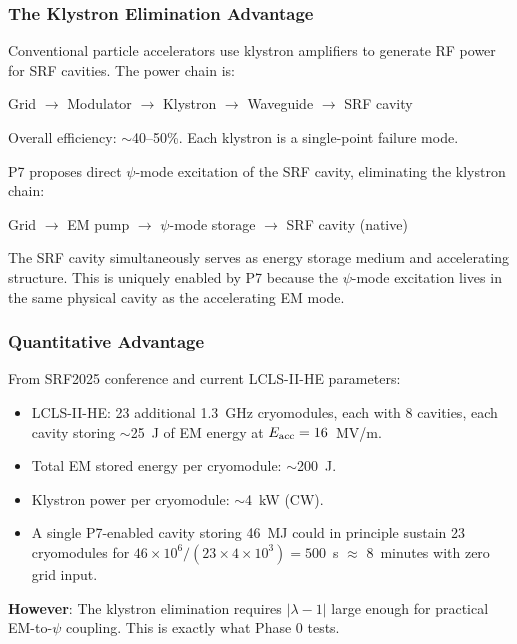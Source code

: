 \documentclass[11pt]{article}
\newcommand{\ee}[1]{\times 10^{#1}}
\newcommand{\lambdaone}{|\lambda-1|}
\begin{document}
\subsubsection{The Klystron Elimination Advantage}

Conventional particle accelerators use klystron amplifiers to generate
RF power for SRF cavities. The power chain is:

\begin{center}
Grid $\to$ Modulator $\to$ Klystron $\to$ Waveguide $\to$ SRF cavity
\end{center}

Overall efficiency: $\sim$40--50\%. Each klystron is a single-point
failure mode.

P7 proposes direct $\psi$-mode excitation of the SRF cavity,
eliminating the klystron chain:

\begin{center}
Grid $\to$ EM pump $\to$ $\psi$-mode storage $\to$ SRF cavity (native)
\end{center}

The SRF cavity simultaneously serves as energy storage medium and
accelerating structure. This is uniquely enabled by P7 because the
$\psi$-mode excitation lives in the same physical cavity as the
accelerating EM mode.

\subsubsection{Quantitative Advantage}

From SRF2025 conference and current LCLS-II-HE parameters:
\begin{itemize}
\item LCLS-II-HE: 23 additional 1.3~GHz cryomodules, each with
  8 cavities, each cavity storing $\sim$25~J of EM energy at
  $E_{\rm acc} = 16$~MV/m.
\item Total EM stored energy per cryomodule: $\sim$200~J.
\item Klystron power per cryomodule: $\sim$4~kW (CW).
\item A single P7-enabled cavity storing 46~MJ could in principle
  sustain 23 cryomodules for $46\ee{6}/(23 \times 4\ee{3})
  = 500$~s $\approx$ 8~minutes with zero grid input.
\end{itemize}

\textbf{However}: The klystron elimination requires $\lambdaone$
large enough for practical EM-to-$\psi$ coupling. This is exactly
what Phase 0 tests.
\end{document}
